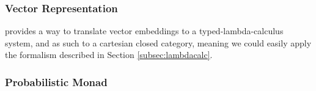 \subsubsection{Vector Representation}
 provides a way to translate vector embeddings to a typed-lambda-calculus system, and as such to a cartesian closed category, meaning we could easily apply the formalism described in Section \ref{subsec:lambdacalc}.

\subsubsection{Probabilistic Monad}
